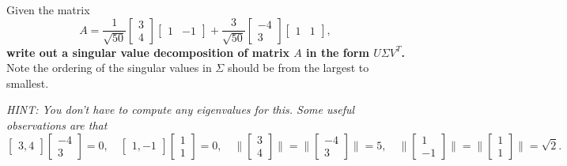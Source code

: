 


Given the matrix $$A = \frac{1}{\sqrt{50}} \begin{bmatrix}
    3\\
    4
  \end{bmatrix}
   \begin{bmatrix}
    1 & -1
  \end{bmatrix} +
  \frac{3}{\sqrt{50}} \begin{bmatrix}
    -4\\
    3
  \end{bmatrix}
   \begin{bmatrix}
    1 & 1
  \end{bmatrix}, $$ \textbf{write out a singular value decomposition
    of matrix $A$ in the form $U \Sigma V^T$.} Note the ordering of the singular values in $\Sigma$ should be from the largest to smallest.

{\em HINT: You don't have to compute any eigenvalues for this.   Some
  useful observations are that
$$\begin{bmatrix}
    3,
    4
  \end{bmatrix} \begin{bmatrix}
    -4\\
    3
  \end{bmatrix} = 0,  \quad \begin{bmatrix}
    1,
    -1
  \end{bmatrix} \begin{bmatrix}
    1\\
    1
  \end{bmatrix} = 0, \quad \| \begin{bmatrix}
    3\\
    4
  \end{bmatrix} \| = \| \begin{bmatrix}
    -4\\
    3
  \end{bmatrix} \| = 5, \quad \| \begin{bmatrix}
    1\\
    -1
  \end{bmatrix} \| = \| \begin{bmatrix}
    1\\
    1  \end{bmatrix} \| = \sqrt{2}.$$ }

